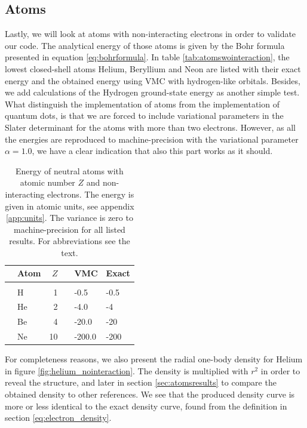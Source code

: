 \subsection{Atoms}
Lastly, we will look at atoms with non-interacting electrons in order to validate our code. The analytical energy of those atoms is given by the Bohr formula presented in equation \eqref{eq:bohrformula}. In table \eqref{tab:atomswointeraction}, the lowest closed-shell atoms Helium, Beryllium and Neon are listed with their exact energy and the obtained energy using VMC with hydrogen-like orbitals. Besides, we add calculations of the Hydrogen ground-state energy as another simple test. What distinguish the implementation of atoms from the implementation of quantum dots, is that we are forced to include variational parameters in the Slater determinant for the atoms with more than two electrons. However, as all the energies are reproduced to machine-precision with the variational parameter $\alpha=1.0$, we have a clear indication that also this part works as it should.

\begin{table}[H]
	\caption{Energy of neutral atoms with atomic number $Z$ and non-interacting electrons. The energy is given in atomic units, see appendix \ref{app:units}. The variance is zero to machine-precision for all listed results. For abbreviations see the text.}
	\label{tab:atomswointeraction}
	\begin{tabularx}{\textwidth}{R{3.5cm}lrrR{2.5cm}R{2.5cm}} \hline\hline
		& Atom & $Z$ & \makecell{\\ \phantom{=}} & VMC & Exact \\ \hline \\
		
		& H & 1 && -0.5 & -0.5 \\
		& He & 2 && -4.0 & -4 \\
		& Be & 4 && -20.0 & -20 \\
		& Ne & 10 && -200.0 & -200 \\ \hline\hline
	\end{tabularx}
\end{table}

For completeness reasons, we also present the radial one-body density for Helium in figure \eqref{fig:helium_nointeraction}. The density is multiplied with $r^2$ in order to reveal the structure, and later in section \ref{sec:atomsresults} to compare the obtained density to other references. We see that the produced density curve is more or less identical to the exact density curve, found from the definition in section \eqref{eq:electron_density}.

